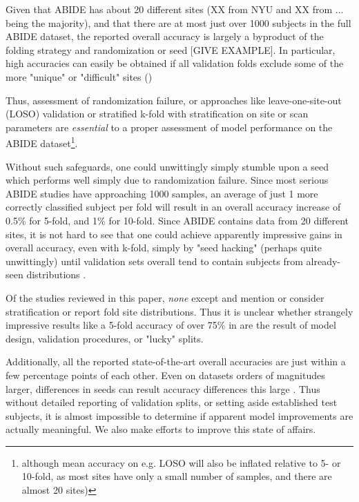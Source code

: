 \documentclass[10pt]{article}
\begin{document}
Given that ABIDE has about 20 different sites (XX from NYU and XX from ... being the majority), and
that there are at most just over 1000 subjects in the full ABIDE dataset, the reported overall
accuracy is largely a byproduct of the folding strategy and randomization or seed [GIVE EXAMPLE].
In particular, high accuracies can easily be obtained if all validation folds exclude some of the
more "unique" or "difficult" sites ()

Thus, assessment
of randomization failure, or approaches like leave-one-site-out (LOSO) validation or stratified
k-fold with stratification on site or scan parameters are \emph{essential} to a proper assessment of
model performance on the ABIDE dataset\footnote{although mean accuracy on e.g. LOSO will also be
inflated relative to 5- or 10-fold, as most sites have only a small number of samples, and there are
almost 20 sites)}.

Without such safeguards, one could unwittingly simply stumble upon a seed which performs well simply
due to randomization failure. Since most serious ABIDE studies have approaching 1000 samples, an
average of just 1 more correctly classified subject per fold will result in an overall accuracy
increase of 0.5\% for 5-fold, and 1\% for 10-fold. Since ABIDE contains data from 20 different
sites, it is not hard to see that one could achieve apparently impressive gains in overall accuracy,
even with k-fold, simply by "seed hacking" (perhaps quite unwittingly) until validation sets overall
tend to contain subjects from already-seen distributions \citep{picardTorchManualSeed2021}.

Of the studies reviewed in this paper, \emph{none} except
\citet{ingalhalikarFunctionalConnectivitybasedPrediction2021} and
\citet{byeonArtificialNeuralNetwork2020} mention or consider stratification or report fold site
distributions. Thus it is unclear whether strangely impressive results like a 5-fold accuracy of
over 75\% in \citet{yangDeepNeuralNetwork2020} are the result of model design, validation
procedures, or "lucky" splits.

Additionally, all the reported state-of-the-art overall accuracies are just within a few percentage
points of each other. Even on datasets orders of magnitudes larger, differences in seeds can result
accuracy differences this large \citep{picardTorchManualSeed2021}. Thus without detailed reporting
of validation splits, or setting aside established test subjects, it is almost impossible to
determine if apparent model improvements are actually meaningful. We also make efforts to improve
this state of affairs.
\end{document}
